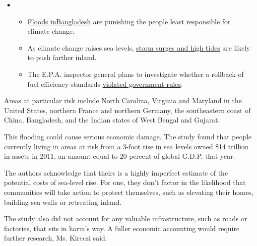 \begin{itemize}
\item
  \begin{itemize}
  \tightlist
  \item
    \href{https://www.nytimes3xbfgragh.onion/2020/07/30/climate/bangladesh-floods.html?action=click\&pgtype=Article\&state=default\&region=MAIN_CONTENT_1\&context=storylines_keepup}{Floods
    in}\href{https://www.nytimes3xbfgragh.onion/2020/07/30/climate/bangladesh-floods.html?action=click\&pgtype=Article\&state=default\&region=MAIN_CONTENT_1\&context=storylines_keepup}{Bangladesh}
    are punishing the people least responsible for climate change.
  \item
    As climate change raises sea levels,
    \href{https://www.nytimes3xbfgragh.onion/2020/07/30/climate/sea-level-inland-floods.html?action=click\&pgtype=Article\&state=default\&region=MAIN_CONTENT_1\&context=storylines_keepup}{storm
    surges and high tides} are likely to push farther inland.
  \item
    The E.P.A. inspector general plans to investigate whether a rollback
    of fuel efficiency standards
    \href{https://www.nytimes3xbfgragh.onion/2020/07/27/climate/trump-fuel-efficiency-rule.html?action=click\&pgtype=Article\&state=default\&region=MAIN_CONTENT_1\&context=storylines_keepup}{violated
    government rules}.
  \end{itemize}
\end{itemize}

Areas at particular risk include North Carolina, Virginia and Maryland
in the United States, northern France and northern Germany, the
southeastern coast of China, Bangladesh, and the Indian states of West
Bengal and Gujarat.

This flooding could cause serious economic damage. The study found that
people currently living in areas at risk from a 3-foot rise in sea
levels owned \$14 trillion in assets in 2011, an amount equal to 20
percent of global G.D.P. that year.

The authors acknowledge that theirs is a highly imperfect estimate of
the potential costs of sea-level rise. For one, they don't factor in the
likelihood that communities will take action to protect themselves, such
as elevating their homes, building sea walls or retreating inland.

The study also did not account for any valuable infrastructure, such as
roads or factories, that sits in harm's way. A fuller economic
accounting would require further research, Ms. Kireczi said.

